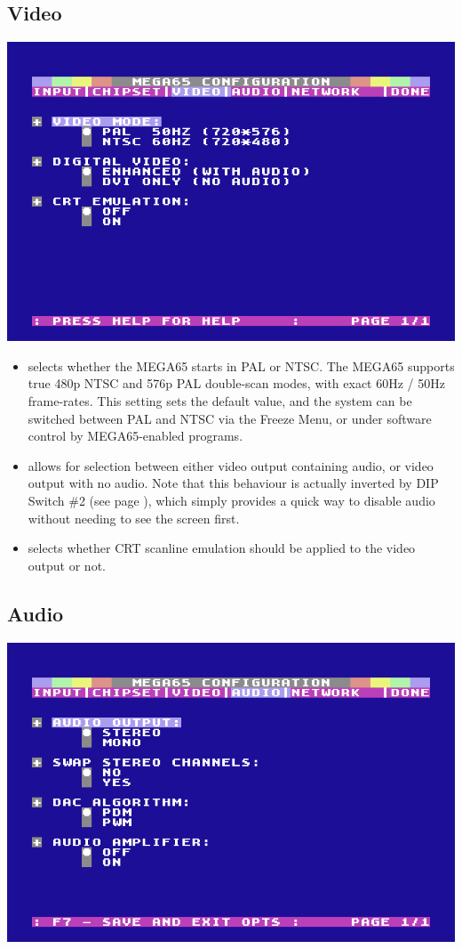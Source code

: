 \subsection{Video}
\label{configuring-video}

\begin{center}
\includegraphics[width=0.7\linewidth]{images/ss-m65config-3.png}
\end{center}
\begin{itemize}
  \item {}
    selects whether the MEGA65 starts in PAL or NTSC.
    The MEGA65 supports true 480p NTSC and 576p PAL double-scan modes, with exact
    60Hz / 50Hz frame-rates. This setting sets the default value, and the system
    can be switched between PAL and NTSC via the Freeze Menu, or under software
    control by MEGA65-enabled programs.
  \item {}
    allows for selection between either  video output containing audio,
    or  video output with no audio. \newline
    Note that this behaviour is actually inverted by DIP Switch \#2 (see page \pageref{sec:dip-switches}),
    which simply provides a quick way to disable audio without needing to see the screen first.
  \item {}
    selects whether CRT scanline emulation should be applied to the video output or not.
\end{itemize}

\subsection{Audio}

\begin{center}
\includegraphics[width=0.7\linewidth]{images/ss-m65config-4.png}
\end{center}

